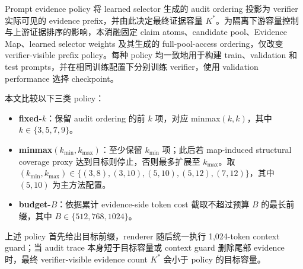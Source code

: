 \documentclass[letterpaper]{article}
\begin{document}
Prompt evidence policy 将 learned selector 生成的 audit ordering 投影为 verifier 实际可见的 evidence prefix，并由此决定最终证据容量 $K^\ast$。为隔离下游容量控制与上游证据排序的影响，本消融固定 claim atoms、candidate pool、Evidence Map、learned selector weights 及其生成的 full-pool-access ordering，仅改变 verifier-visible prefix policy。每种 policy 均一致地用于构建 train、validation 和 test prompts，并在相同训练配置下分别训练 verifier，使用 validation performance 选择 checkpoint。

本文比较以下三类 policy：

\begin{itemize}
\item \textbf{fixed-$k$}：保留 audit ordering 的前 $k$ 项，对应 minmax$(k,k)$，其中 $k\in\{3,5,7,9\}$。
\item \textbf{minmax$(k_{\min},k_{\max})$}：至少保留 $k_{\min}$ 项；此后若 map-induced structural coverage proxy 达到目标则停止，否则最多扩展至 $k_{\max}$。取 $(k_{\min},k_{\max})\in\{(3,8),(3,10),(5,10),(5,12),(7,12)\}$，其中 $(5,10)$ 为主方法配置。
\item \textbf{budget-$B$}：依据累计 evidence-side token cost 截取不超过预算 $B$ 的最长前缀，其中 $B\in\{512,768,1024\}$。
\end{itemize}

上述 policy 首先给出目标前缀，renderer 随后统一执行 1,024-token context guard；当 audit trace 本身短于目标容量或 context guard 删除尾部 evidence 时，最终 verifier-visible evidence count $K^\ast$ 会小于 policy 的目标容量。
\end{document}
